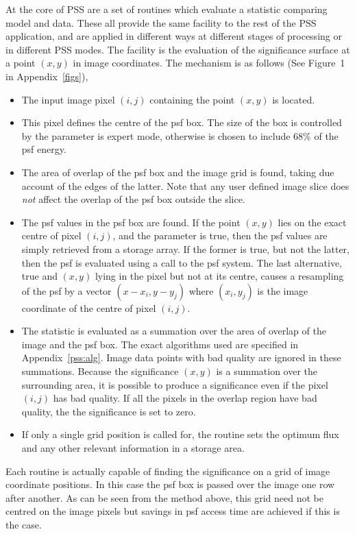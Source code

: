At the core of PSS are a set of routines which evaluate a statistic 
comparing model and data. These all provide the same facility to the
rest of the PSS application, and are applied in different ways at
different stages of processing or in different PSS modes. The facility
is the evaluation of the significance surface at a point $(x,y)$ in
image coordinates. The mechanism is as follows (See Figure~1 in 
Appendix~\ref{figs}),
\begin{itemize}
\item The input image pixel $(i,j)$ containing the point $(x,y)$ is located.
\item This pixel defines the centre of the psf box. The size of the box
is controlled by the  parameter is expert mode, otherwise is
chosen to include 68\% of the psf energy.
\item The area of overlap of the psf box and the image grid is found,
taking due account of the edges of the latter. Note that any user defined
image slice does {\em not} affect the overlap of the psf box outside the
slice.
\item The psf values in the psf box are found. If the point $(x,y)$ lies
on the exact centre of pixel $(i,j)$, and the parameter  is
true, then the psf values are simply retrieved from a storage array. If
the former is true, but not the latter, then the psf is evaluated using
a call to the psf system. The last alternative,  true and
$(x,y)$ lying in the pixel but not at its centre, causes a resampling
of the psf by a vector $(x-x_i,y-y_j)$ where $(x_i,y_j)$ is the image
coordinate of the centre of pixel $(i,j)$.
\item The statistic is evaluated as a summation over the area of overlap
of the image and the psf box. The exact algorithms used are specified in
Appendix~\ref{pss:alg}. Image data points with bad quality are ignored
in these summations. Because the significance $(x,y)$ is a summation over
the surrounding area, it is possible to produce a significance even if
the pixel $(i,j)$ has bad quality. If all the pixels in the overlap
region have bad quality, the the significance is set to zero.
\item If only a single grid position is called for, the routine
sets the optimum flux and any other relevant information in a storage
area.
\end{itemize}
Each routine is actually capable of finding the significance on a grid
of image coordinate positions. In this case the psf box is passed over
the image one row after another. As can be seen from the method above,
this grid need not be centred on the image pixels but savings in psf
access time are achieved if this is the case.

